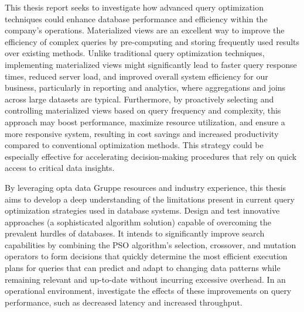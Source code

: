 This thesis report seeks to investigate how advanced query optimization techniques could enhance database performance and efficiency within the company's operations. Materialized views are an excellent way to improve the efficiency of complex queries by pre-computing and storing frequently used results over existing methods. Unlike traditional query optimization techniques, implementing materialized views might significantly lead to faster query response times, reduced server load, and improved overall system efficiency for our business, particularly in reporting and analytics, where aggregations and joins across large datasets are typical. Furthermore, by proactively selecting and controlling materialized views based on query frequency and complexity, this approach may boost performance, maximize resource utilization, and ensure a more responsive system, resulting in cost savings and increased productivity compared to conventional optimization methods. This strategy could be especially effective for accelerating decision-making procedures that rely on quick access to critical data insights.\vspace{.4cm}

By leveraging opta data Gruppe resources and industry experience, this thesis aims to develop a deep understanding of the limitations present in current query optimization strategies used in database systems. Design and test innovative approaches (a sophisticated algorithm solution) capable of overcoming the prevalent hurdles of databases. It intends to significantly improve search capabilities by combining the PSO algorithm's selection, crossover, and mutation operators to form decisions that quickly determine the most efficient execution plans for queries that can predict and adapt to changing data patterns while remaining relevant and up-to-date without incurring excessive overhead. In an operational environment, investigate the effects of these improvements on query performance, such as decreased latency and increased throughput. \vspace{.4cm}




